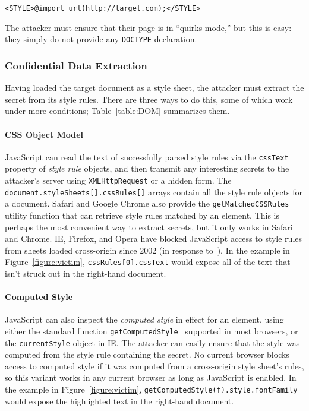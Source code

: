 \documentclass{sig-alternate}
\begin{document}
\verb|<STYLE>@import url(http://target.com);</STYLE>|

\noindent
The attacker must ensure that their page is in “quirks mode,” but this
is easy: they simply do not provide any \verb|DOCTYPE| declaration.

\subsubsection{Confidential Data Extraction}\label{sec:extraction}
Having loaded the target document as a style sheet, the attacker must
extract the secret from its style rules. There are three ways to do
this, some of which work under more conditions; Table~\ref{table:DOM}
summarizes them.

\paragraph{CSS Object Model}
JavaScript can read the text of successfully parsed style rules via
the \texttt{cssText} property of \emph{style rule} objects, and then
transmit any interesting secrets to the attacker's server using
\texttt{XMLHttpRequest} or a hidden form.  The
\texttt{document.\discretionary{}{}{}styleSheets[].cssRules[]} arrays
contain all the style rule objects for a document.  Safari and Google
Chrome also provide the \texttt{getMatchedCSSRules} utility function
that can retrieve style rules matched by an element.  This is perhaps
the most convenient way to extract secrets, but it only works in
Safari and Chrome.  IE, Firefox, and Opera have blocked JavaScript
access to style rules from sheets loaded cross-origin since 2002 (in
response to~\cite{cssxss02}).  In the example in
Figure~\ref{figure:victim}, \texttt{cssRules[0].cssText} would expose
all of the text that isn't struck out in the right-hand document.

\paragraph{Computed Style}
JavaScript can also inspect the \emph{computed style} in effect for an
element, using either the standard function
\texttt{getComputed\-Style}~\cite{domcss} supported in most browsers,
or the \texttt{currentStyle} object in IE.  The attacker can easily
ensure that the style was computed from the style rule containing the
secret.  No current browser blocks access to computed style if it was
computed from a cross-origin style sheet's rules, so this variant
works in any current browser as long as JavaScript is enabled.  In the
example in Figure~\ref{figure:victim},
\texttt{getComputedStyle(f).\discretionary{}{}{}style.fontFamily}
would expose the highlighted text in the right-hand document.
\end{document}
